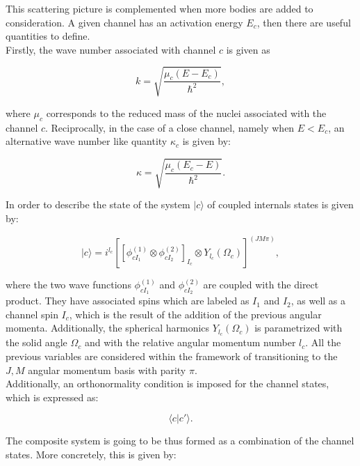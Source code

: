 \documentclass[openany]{book}
\begin{document}
This scattering picture is complemented when more bodies are added to consideration. A given channel has an activation energy $E_c$, then there are useful quantities to define. \\

Firstly, the wave number associated with channel $c$ is given as 

\begin{equation}\label{rmatrix_channels_waveNumber}
	k = \sqrt{\frac{\mu_c(E - E_c)}{\hbar^2}},
\end{equation}

where $\mu_c$ corresponds to the reduced mass of the nuclei associated with the channel $c$. Reciprocally, in the case of a close channel, namely when $E < E_c$, an alternative wave number like quantity $\kappa_c$ is given by:

\begin{equation}\label{rmatrix_channels_waveNumber_closed}
	\kappa = \sqrt{\frac{\mu_c(E_c - E)}{\hbar^2}}.
\end{equation}

In order to describe the state of the system $	|c\rangle$ of coupled internals states is given by: 


\begin{equation}\label{rmatrix_channels_state}
	|c\rangle = i^{l_c} [[\phi^{(1)}_{cI_1} \otimes  \phi^{(2)}_{cI_2}]_{I_c} \otimes Y_{l_c}(\Omega_c) ]^{(JM\pi)},
\end{equation}

where the two wave functions $\phi^{(1)}_{cI_1}$ and $\phi^{(2)}_{cI_2}$ are coupled with the direct product. They have associated spins which are labeled as $I_1$ and $I_2$, as well as a channel spin $I_c$, which is the result of the addition of the previous angular momenta. Additionally, the spherical harmonics $Y_{l_c}(\Omega_c)$ is parametrized with the solid angle $\Omega_c$ and with the relative angular momentum number $l_c$. All the previous variables are considered within the framework of transitioning to the $J, M$ angular momentum basis with parity $\pi$. \\

Additionally, an orthonormality condition is imposed for the channel states, which is expressed as: 

\begin{equation}\label{rmatrix_channels_orthonormality}
	\langle c| c' \rangle.
\end{equation}

The composite system is going to be thus formed as a combination of the channel states. More concretely, this is given by: 
\end{document}
